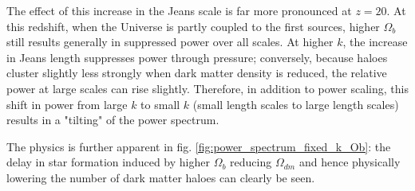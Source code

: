\documentclass[floats,floatfix,showpacs,amssymb,prd,superscriptaddress,nofootinbib]{revtex4-2} %
\begin{document}
The effect of this increase in the Jeans scale is far more pronounced at $z = 20$. At this redshift, when the Universe is partly coupled to the first sources, higher $\Omega_b$ still results generally in suppressed power over all scales. At higher $k$, the increase in Jeans length suppresses power through pressure; conversely, because haloes cluster slightly less strongly when dark matter density is reduced, the relative power at large scales can rise slightly. Therefore, in addition to power scaling, this shift in power from large $k$ to small $k$ (small length scales to large length scales) results in a "tilting" of the power spectrum.

The physics is further apparent in fig. \ref{fig:power_spectrum_fixed_k_Ob}: the delay in star formation induced by higher $\Omega_b$ reducing $\Omega_{dm}$ and hence physically lowering the number of dark matter haloes can clearly be seen. 
\end{document}
